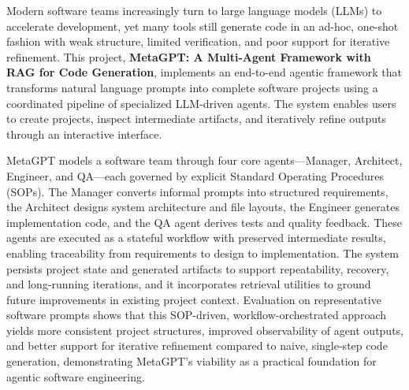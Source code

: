 \justifying
Modern software teams increasingly turn to large language models (LLMs) to accelerate development, yet many tools still generate code in an ad-hoc, one-shot fashion with weak structure, limited verification, and poor support for iterative refinement. This project, \textbf{MetaGPT: A Multi-Agent Framework with RAG for Code Generation}, implements an end-to-end agentic framework that transforms natural language prompts into complete software projects using a coordinated pipeline of specialized LLM-driven agents. The system enables users to create projects, inspect intermediate artifacts, and iteratively refine outputs through an interactive interface.

MetaGPT models a software team through four core agents---Manager, Architect, Engineer, and QA---each governed by explicit Standard Operating Procedures (SOPs). The Manager converts informal prompts into structured requirements, the Architect designs system architecture and file layouts, the Engineer generates implementation code, and the QA agent derives tests and quality feedback. These agents are executed as a stateful workflow with preserved intermediate results, enabling traceability from requirements to design to implementation. The system persists project state and generated artifacts to support repeatability, recovery, and long-running iterations, and it incorporates retrieval utilities to ground future improvements in existing project context. Evaluation on representative software prompts shows that this SOP-driven, workflow-orchestrated approach yields more consistent project structures, improved observability of agent outputs, and better support for iterative refinement compared to naive, single-step code generation, demonstrating MetaGPT’s viability as a practical foundation for agentic software engineering.
\\[0.5cm]